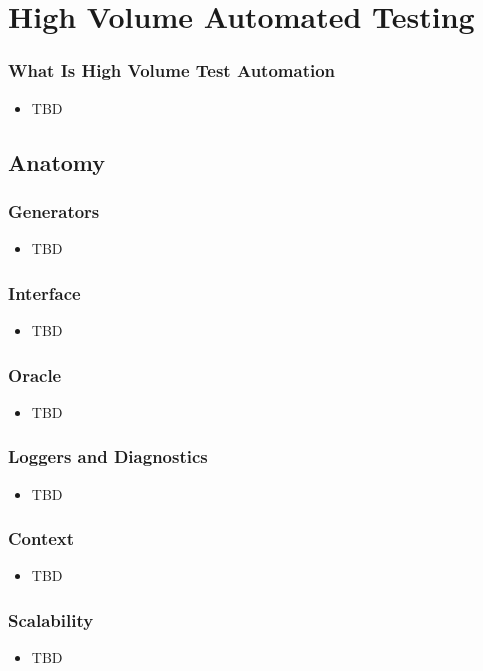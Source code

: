 \section{High Volume Automated Testing}

\begin{frame}
  \frametitle{What Is High Volume Test Automation}
  \begin{itemize}
    \item TBD
  \end{itemize}
\end{frame}

\subsection{Anatomy}

\begin{frame}
  \frametitle{Generators}
  \begin{itemize}
    \item TBD
  \end{itemize}
\end{frame}

\begin{frame}
  \frametitle{Interface}
  \begin{itemize}
    \item TBD
  \end{itemize}
\end{frame}

\begin{frame}
  \frametitle{Oracle}
  \begin{itemize}
    \item TBD
  \end{itemize}
\end{frame}

\begin{frame}
  \frametitle{Loggers and Diagnostics}
  \begin{itemize}
    \item TBD
  \end{itemize}
\end{frame}

\begin{frame}
  \frametitle{Context}
  \begin{itemize}
    \item TBD
  \end{itemize}
\end{frame}

\begin{frame}
  \frametitle{Scalability}
  \begin{itemize}
    \item TBD
  \end{itemize}
\end{frame}

